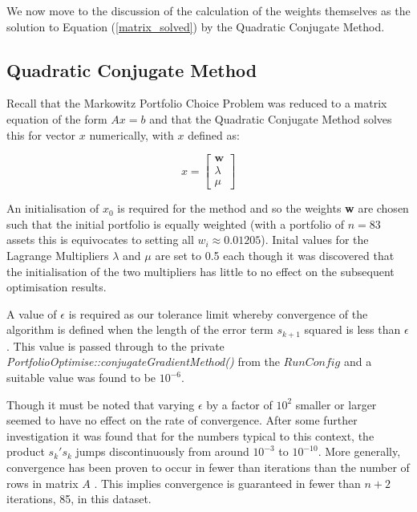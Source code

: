 \documentclass{article}
\begin{document}
We now move to the discussion of the calculation of the weights themselves as the solution to Equation (\ref{matrix_solved}) by the Quadratic Conjugate Method.



\subsection{Quadratic Conjugate Method}
\label{sec:qcm}


Recall that the Markowitz Portfolio Choice Problem was reduced to a matrix equation of the form $Ax = b$ and that the Quadratic Conjugate Method solves this for vector $x$ numerically, with $x$ defined as:


\begin{equation}
x=
\begin{bmatrix}
\textbf{w}\\
\lambda \\
\mu
\end{bmatrix}
\end{equation}

An initialisation of $x_0$ is required for the method and so the weights \textbf{w} are chosen such that the initial portfolio is equally weighted (with a portfolio of $n = 83$ assets this is equivocates to setting all $w_i \approx 0.01205$). Inital values for the Lagrange Multipliers $\lambda$ and $\mu$ are set to 0.5 each though it was discovered that the initialisation of the two multipliers has little to no effect on the subsequent optimisation results.

A value of $\epsilon$ is required as our tolerance limit whereby convergence of the algorithm is defined when the length of the error term $s_{k+1}$ squared is less than $\epsilon$. This value is passed through to the private \textit{PortfolioOptimise::conjugateGradientMethod()} from the $RunConfig$ and a suitable value was found to be $10^{-6}$.

Though it must be noted that varying $\epsilon$ by a factor of $10^2$ smaller or larger seemed to have no effect on the rate of convergence. After some further investigation it was found that for the numbers typical to this context, the product $s_{k}'s_{k}$ jumps discontinuously from around $10^{-3}$ to $10^{-10}$. More generally, convergence has been proven to occur in fewer than iterations than the number of rows in matrix $A$ \cite{qcm_convergence}. This implies convergence is guaranteed in fewer than $n+2$ iterations, 85, in this dataset.
\end{document}
